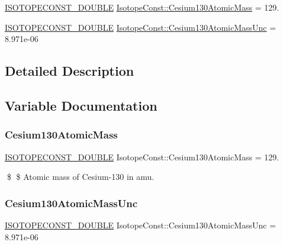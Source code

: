 \begin{DoxyCompactItemize}
\item 
\mbox{\hyperlink{group___isotope_const-_macros_ga8f45a7272ce02c0b4c65c44636ed719a}{I\+S\+O\+T\+O\+P\+E\+C\+O\+N\+S\+T\+\_\+\+D\+O\+U\+B\+LE}} \mbox{\hyperlink{group___isotope_const-_cesium-_cs130_ga24c1b0abee96f4c227938a09ec0697ad}{Isotope\+Const\+::\+Cesium130\+Atomic\+Mass}} = 129.
\item 
\mbox{\hyperlink{group___isotope_const-_macros_ga8f45a7272ce02c0b4c65c44636ed719a}{I\+S\+O\+T\+O\+P\+E\+C\+O\+N\+S\+T\+\_\+\+D\+O\+U\+B\+LE}} \mbox{\hyperlink{group___isotope_const-_cesium-_cs130_ga3aa12d3bfa61e142b6d1b938a2763254}{Isotope\+Const\+::\+Cesium130\+Atomic\+Mass\+Unc}} = 8.\+971e-\/06
\end{DoxyCompactItemize}


\subsection{Detailed Description}


\subsection{Variable Documentation}
\mbox{\label{group___isotope_const-_cesium-_cs130_ga24c1b0abee96f4c227938a09ec0697ad}} 
\subsubsection{\texorpdfstring{Cesium130\+Atomic\+Mass}{Cesium130AtomicMass}}
{\footnotesize\ttfamily \mbox{\hyperlink{group___isotope_const-_macros_ga8f45a7272ce02c0b4c65c44636ed719a}{I\+S\+O\+T\+O\+P\+E\+C\+O\+N\+S\+T\+\_\+\+D\+O\+U\+B\+LE}} Isotope\+Const\+::\+Cesium130\+Atomic\+Mass = 129.}

\$ \$ Atomic mass of Cesium-\/130 in amu. \mbox{\label{group___isotope_const-_cesium-_cs130_ga3aa12d3bfa61e142b6d1b938a2763254}} 
\subsubsection{\texorpdfstring{Cesium130\+Atomic\+Mass\+Unc}{Cesium130AtomicMassUnc}}
{\footnotesize\ttfamily \mbox{\hyperlink{group___isotope_const-_macros_ga8f45a7272ce02c0b4c65c44636ed719a}{I\+S\+O\+T\+O\+P\+E\+C\+O\+N\+S\+T\+\_\+\+D\+O\+U\+B\+LE}} Isotope\+Const\+::\+Cesium130\+Atomic\+Mass\+Unc = 8.\+971e-\/06}

